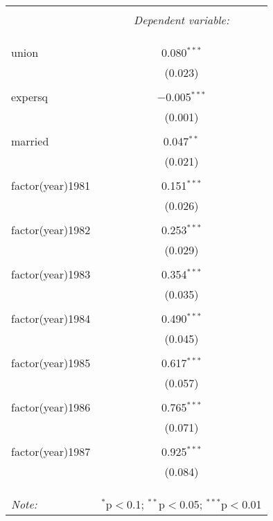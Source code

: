 
\begin{table}[!htbp] \centering 
  \caption{} 
  \label{} 
\begin{tabular}{@{\extracolsep{5pt}}lc} 
\\[-1.8ex]\hline 
\hline \\[-1.8ex] 
 & \multicolumn{1}{c}{\textit{Dependent variable:}} \\ 
\cline{2-2} 
\\[-1.8ex] &   \\ 
\hline \\[-1.8ex] 
 union & 0.080$^{***}$ \\ 
  & (0.023) \\ 
  & \\ 
 expersq & $-$0.005$^{***}$ \\ 
  & (0.001) \\ 
  & \\ 
 married & 0.047$^{**}$ \\ 
  & (0.021) \\ 
  & \\ 
 factor(year)1981 & 0.151$^{***}$ \\ 
  & (0.026) \\ 
  & \\ 
 factor(year)1982 & 0.253$^{***}$ \\ 
  & (0.029) \\ 
  & \\ 
 factor(year)1983 & 0.354$^{***}$ \\ 
  & (0.035) \\ 
  & \\ 
 factor(year)1984 & 0.490$^{***}$ \\ 
  & (0.045) \\ 
  & \\ 
 factor(year)1985 & 0.617$^{***}$ \\ 
  & (0.057) \\ 
  & \\ 
 factor(year)1986 & 0.765$^{***}$ \\ 
  & (0.071) \\ 
  & \\ 
 factor(year)1987 & 0.925$^{***}$ \\ 
  & (0.084) \\ 
  & \\ 
\hline \\[-1.8ex] 
\hline 
\hline \\[-1.8ex] 
\textit{Note:}  & \multicolumn{1}{r}{$^{*}$p$<$0.1; $^{**}$p$<$0.05; $^{***}$p$<$0.01} \\ 
\end{tabular} 
\end{table} 
